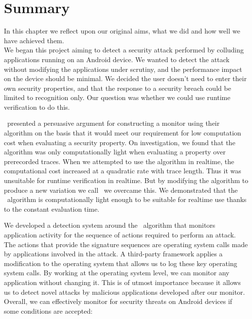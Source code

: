 \chapter{Summary}
\label{chap:Summary}

In this chapter we reflect upon our original aims, what we did and how well we have achieved them.\\

\noindent
We began this project aiming to detect a security attack performed by colluding applications running on an Android device.  We wanted to detect the attack without modifying the applications under scrutiny, and the performance impact on the device should be minimal.  We decided the user doesn't need to enter their own security properties, and that the response to a security breach could be limited to recognition only.  Our question was whether we could use runtime verification to do this.

\GRKH\ presented a persuasive argument for constructing a monitor using their algorithm on the basis that it would meet our requirement for low computation cost when evaluating a security property.  On investigation, we found that the algorithm was only computationally light when evaluating a property over prerecorded traces.   When we attempted to use the algorithm in realtime, the computational cost increased at a quadratic rate with trace length.  Thus it was unsuitable for runtime verification in realtime.  But by modifying the algorithm to produce a new variation we call \RRH\, we overcame this.  We demonstrated that the \RRH\ algorithm is computationally light enough to be suitable for realtime use thanks to the constant evaluation time.

We developed a detection system around the \RRH\ algorithm that monitors application activity for the sequence of actions required to perform an attack.  The actions that provide the signature sequences are operating system calls made by applications involved in the attack.  A third-party framework applies a modification to the operating system that allows us to log these key operating system calls.  By working at the operating system level, we can monitor any application without changing it.  This is of utmost importance because it allows us to detect novel attacks by malicious applications developed after our monitor.\\

\noindent
Overall, we can effectively monitor for security threats on Android devices if some conditions are accepted:

